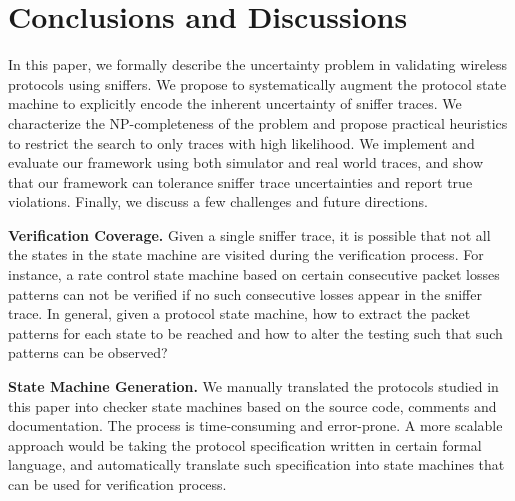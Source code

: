 \section{Conclusions and Discussions}
\label{sec:conclusion}

In this paper, we formally describe the uncertainty problem in validating
wireless protocols using sniffers. We propose to systematically augment the
protocol state machine to explicitly encode the inherent uncertainty of sniffer
traces. We characterize the NP-completeness of the problem and propose practical
heuristics to restrict the search to only traces with high likelihood.  We
implement and evaluate our framework using both \ns{} simulator and real world
traces, and show that our framework can tolerance sniffer trace uncertainties
and report true violations. Finally, we discuss a few challenges and future
directions.

\textbf{Verification Coverage.} Given a single sniffer trace, it is possible
that not all the states in the state machine are visited during the verification
process. For instance, a rate control state machine based on certain consecutive
packet losses patterns can not be verified if no such consecutive losses appear
in the sniffer trace. In general, given a protocol state machine, how to extract
the packet patterns for each state to be reached and how to alter the testing
such that such patterns can be observed?

\textbf{State Machine Generation.} We manually translated the protocols studied
in this paper into checker state machines based on the source code, comments and
documentation. The process is time-consuming and error-prone. A more scalable
approach would be taking the protocol specification written in certain formal
language, and automatically translate such specification into state machines
that can be used for verification process.

